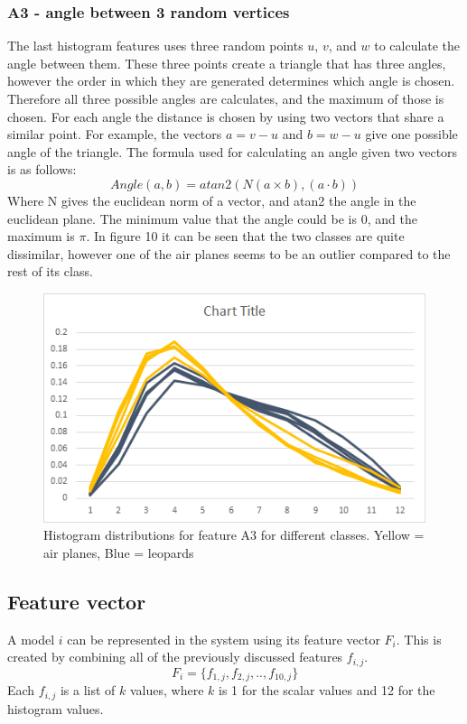 \documentclass{bigdata}
\begin{document}
\subsubsection{A3 - angle between 3 random vertices}
The last histogram features uses three random points $u$, $v$, and $w$ to calculate the angle between them. These three points create a triangle that has three angles, however the order in which they are generated determines which angle is chosen. Therefore all three possible angles are calculates, and the maximum of those is chosen. For each angle the distance is chosen by using two vectors that share a similar point. For example, the vectors $a = v-u$ and $b = w-u$ give one possible angle of the triangle. The formula used for calculating an angle given two vectors is as follows:
\begin{equation}
Angle(a,b) = atan2(N(a \times b), (a \cdot b))
\end{equation}
Where N gives the euclidean norm of a vector, and atan2 the angle in the euclidean plane. The minimum value that the angle could be is 0, and the maximum is $\pi$.
In figure 10 it can be seen that the two classes are quite dissimilar, however one of the air planes seems to be an outlier compared to the rest of its class.

\begin{figure}[h!]
    \includegraphics[width=0.7\linewidth]{Pictures/Part3/A3.png}
    \caption{Histogram distributions for feature A3 for different classes. Yellow = air planes, Blue = leopards}
  \label{fig:eccentricity}
\end{figure}

\subsection{Feature vector}
A model $i$ can be represented in the system using its feature vector $F_i$. This is created by combining all of the previously discussed features $f_{i,j}$.
\begin{equation}
F_i = \{f_{1,j}, f_{2,j}, .. , f_{10,j}\}
\end{equation}
Each $f_{i,j}$ is a list of $k$ values, where $k$ is 1 for the scalar values and 12 for the histogram values.
\end{document}
